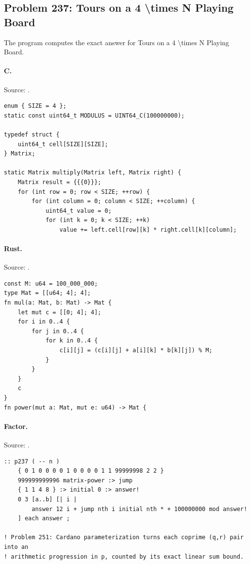 \subsection{Problem 237: Tours on a 4 \textbackslash{}times N Playing Board}
\label{walkthrough:p237}
The program computes the exact answer for Tours on a 4 \textbackslash{}times N Playing Board.

\paragraph{C.} Source: .
\begin{lstlisting}
enum { SIZE = 4 };
static const uint64_t MODULUS = UINT64_C(100000000);

typedef struct {
    uint64_t cell[SIZE][SIZE];
} Matrix;

static Matrix multiply(Matrix left, Matrix right) {
    Matrix result = {{{0}}};
    for (int row = 0; row < SIZE; ++row) {
        for (int column = 0; column < SIZE; ++column) {
            uint64_t value = 0;
            for (int k = 0; k < SIZE; ++k)
                value += left.cell[row][k] * right.cell[k][column];
\end{lstlisting}

\paragraph{Rust.} Source: .
\begin{lstlisting}
const M: u64 = 100_000_000;
type Mat = [[u64; 4]; 4];
fn mul(a: Mat, b: Mat) -> Mat {
    let mut c = [[0; 4]; 4];
    for i in 0..4 {
        for j in 0..4 {
            for k in 0..4 {
                c[i][j] = (c[i][j] + a[i][k] * b[k][j]) % M;
            }
        }
    }
    c
}
fn power(mut a: Mat, mut e: u64) -> Mat {
\end{lstlisting}

\paragraph{Factor.} Source: .
\begin{lstlisting}
:: p237 ( -- n )
    { 0 1 0 0 0 0 1 0 0 0 0 1 1 99999998 2 2 }
    999999999996 matrix-power :> jump
    { 1 1 4 8 } :> initial 0 :> answer!
    0 3 [a..b] [| i |
        answer 12 i + jump nth i initial nth * + 100000000 mod answer!
    ] each answer ;

! Problem 251: Cardano parameterization turns each coprime (q,r) pair into an
! arithmetic progression in p, counted by its exact linear sum bound.
\end{lstlisting}

